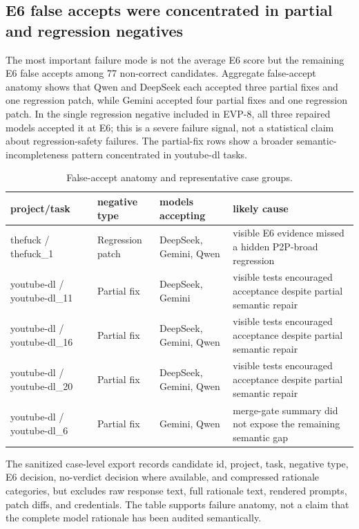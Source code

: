 \documentclass[conference]{IEEEtran}
\begin{document}
\subsection{E6 false accepts were concentrated in partial and regression negatives}

The most important failure mode is not the average E6 score but the remaining E6 false accepts among 77 non-correct candidates. Aggregate false-accept anatomy shows that Qwen and DeepSeek each accepted three partial fixes and one regression patch, while Gemini accepted four partial fixes and one regression patch. In the single regression negative included in EVP-8, all three repaired models accepted it at E6; this is a severe failure signal, not a statistical claim about regression-safety failures. The partial-fix rows show a broader semantic-incompleteness pattern concentrated in youtube-dl tasks.

\begin{table}[t]
\centering
\scriptsize
\setlength{\tabcolsep}{2pt}
\caption{False-accept anatomy and representative case groups.}
\label{tab:apsec-6}
\begin{tabularx}{\textwidth}{YYYY}
\toprule
project/task & negative type & models accepting & likely cause \\
\midrule
thefuck / thefuck\_1 & Regression patch & DeepSeek, Gemini, Qwen & visible E6 evidence missed a hidden P2P-broad regression \\
youtube-dl / youtube-dl\_11 & Partial fix & DeepSeek, Gemini & visible tests encouraged acceptance despite partial semantic repair \\
youtube-dl / youtube-dl\_16 & Partial fix & DeepSeek, Gemini, Qwen & visible tests encouraged acceptance despite partial semantic repair \\
youtube-dl / youtube-dl\_20 & Partial fix & DeepSeek, Gemini, Qwen & visible tests encouraged acceptance despite partial semantic repair \\
youtube-dl / youtube-dl\_6 & Partial fix & Gemini, Qwen & merge-gate summary did not expose the remaining semantic gap \\
\bottomrule
\end{tabularx}
\end{table}

The sanitized case-level export records candidate id, project, task, negative type, E6 decision, no-verdict decision where available, and compressed rationale categories, but excludes raw response text, full rationale text, rendered prompts, patch diffs, and credentials. The table supports failure anatomy, not a claim that the complete model rationale has been audited semantically.
\end{document}
